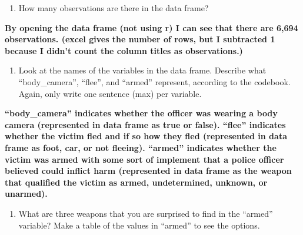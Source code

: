\documentclass[
]{article}
\newenvironment{Shaded}{\begin{snugshade}}{\end{snugshade}}
\newcommand{\FunctionTok}[1]{\textcolor[rgb]{0.00,0.00,0.00}{#1}}
\newcommand{\NormalTok}[1]{#1}
\newcommand{\SpecialCharTok}[1]{\textcolor[rgb]{0.00,0.00,0.00}{#1}}
\providecommand{\tightlist}{%
  \setlength{\itemsep}{0pt}\setlength{\parskip}{0pt}}
\begin{document}
\begin{enumerate}
\def\labelenumi{\alph{enumi}.}
\setcounter{enumi}{1}
\tightlist
\item
  How many observations are there in the data frame?
\end{enumerate}

\textbf{By opening the data frame (not using r) I can see that there are
6,694 observations. (excel gives the number of rows, but I subtracted 1
because I didn't count the column titles as observations.) }

\begin{enumerate}
\def\labelenumi{\alph{enumi}.}
\setcounter{enumi}{2}
\tightlist
\item
  Look at the names of the variables in the data frame. Describe what
  ``body\_camera'', ``flee'', and ``armed'' represent, according to the
  codebook. Again, only write one sentence (max) per variable.
\end{enumerate}

\textbf{``body\_camera'' indicates whether the officer was wearing a
body camera (represented in data frame as true or false). ``flee''
indicates whether the victim fled and if so how they fled (represented
in data frame as foot, car, or not fleeing). ``armed'' indicates whether
the victim was armed with some sort of implement that a police officer
believed could inflict harm (represented in data frame as the weapon
that qualified the victim as armed, undetermined, unknown, or unarmed).}

\begin{enumerate}
\def\labelenumi{\alph{enumi}.}
\setcounter{enumi}{3}
\tightlist
\item
  What are three weapons that you are surprised to find in the ``armed''
  variable? Make a table of the values in ``armed'' to see the options.
\end{enumerate}

\begin{Shaded}
\end{Shaded}
\end{document}
